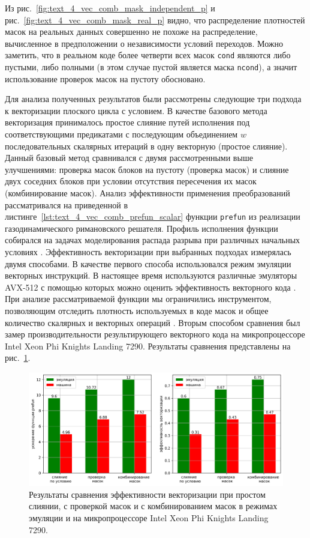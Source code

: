 Из рис.~\ref{fig:text_4_vec_comb_mask_independent_p} и рис.~\ref{fig:text_4_vec_comb_mask_real_p} видно, что распределение плотностей масок на реальных данных совершенно не похоже на распределение, вычисленное в предположении о независимости условий переходов.
Можно заметить, что в реальном коде более четверти всех масок \texttt{cond} являются либо пустыми, либо полными (в этом случае пустой является маска \texttt{ncond}), а значит использование проверок масок на пустоту обосновано.

Для анализа полученных результатов были рассмотрены следующие три подхода к векторизации плоского цикла с условием.
В качестве базового метода векторизация принималось простое слияние путей исполнения под соответствующими предикатами с последующим объединением $w$ последовательных скалярных итераций в одну векторную (простое слияние).
Данный базовый метод сравнивался с двумя рассмотренными выше улучшениями: проверка масок блоков на пустоту (проверка масок) и слияние двух соседних блоков при условии отсутствия пересечения их масок (комбинирование масок).
Анализ эффективности применения преобразований рассматривался на приведенной в листинге~\ref{lst:text_4_vec_comb_prefun_scalar} функции \texttt{prefun} из реализации газодинамического римановского решателя.
Профиль исполнения функции собирался на задачах моделирования распада разрыва при различных начальных условиях \cite{Toh2024VecRiemann,Zeng2024VecRiemann}.
Эффективность векторизации при выбранных подходах измерялась двумя способами.
В качестве первого способа использовался режим эмуляции векторных инструкций.
В настоящее время используются различные эмуляторы AVX-512 с помощью которых можно оценить эффективность векторного кода \cite{Lee2024VecGem}.
При анализе рассматриваемой функции мы ограничились инструментом, позволяющим отследить плотность используемых в коде масок и общее количество скалярных и векторных операций \cite{Rybakov2023VecShvindt}.
Вторым способом сравнения был замер производительности результирующего векторного кода на микропроцессоре Intel Xeon Phi Knights Landing 7290.
Результаты сравнения представлены на рис.~\ref{fig:text_4_vec_comb_mask_res}.

\begin{figure}[ht]
\centering
\includegraphics[width=1.0\textwidth]{./pics/text_4_vec_comb_mask/res.png}
\singlespacing
{}\caption{Результаты сравнения эффективности векторизации при простом слиянии, с проверкой масок и с комбинированием масок в режимах эмуляции и на микропроцессоре Intel Xeon Phi Knights Landing 7290.}
\label{fig:text_4_vec_comb_mask_res}
\end{figure}

